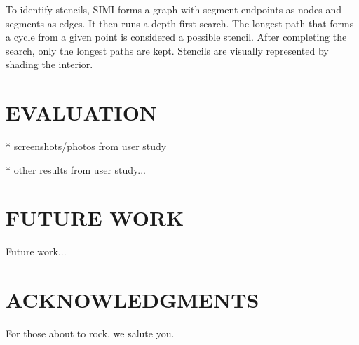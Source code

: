 \documentclass{article}
\begin{document}
To identify stencils, SIMI forms a graph with segment endpoints as
nodes and segments as edges. It then runs a depth-first search. The
longest path that forms a cycle from a given point is considered a
possible stencil. After completing the search, only the longest paths
are kept. Stencils are visually represented by shading the
interior. 

\section{EVALUATION}

* screenshots/photos from user study

* other results from user study...

\section{FUTURE WORK}

Future work...

\section{ACKNOWLEDGMENTS}


For those about to rock, we salute you.



\end{document}
